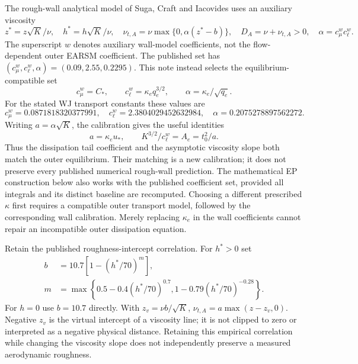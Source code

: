 \documentclass[11pt,a4paper]{article}
\numberwithin{equation}{section}
\begin{document}
The rough-wall analytical model of Suga, Craft and Iacovides \cite{SCI2006} uses an
auxiliary viscosity
\begin{equation}
 z^*=z\sqrt K/\nu,\quad h^*=h\sqrt K/\nu,\quad
 \nu_{t,A}=\nu\max\{0,\alpha(z^*-b)\},\quad
 D_A=\nu+\nu_{t,A}>0,\quad \alpha=c_\mu^wc_\ell^w.
 \label{eq:wj-wall-viscosity}
\end{equation}
The superscript $w$ denotes auxiliary wall-model coefficients, not the
flow-dependent outer EARSM coefficient. The published set has
$(c_\mu^w,c_\ell^w,\alpha)=(0.09,2.55,0.2295)$. This note instead selects
the equilibrium-compatible set
\begin{equation}
 \boxed{c_\mu^w=C_*,\qquad c_\ell^w=\kappa_e q_e^{3/2},\qquad
 \alpha=\kappa_e/\sqrt{q_e}.}
 \label{eq:wj-wall-calibration}
\end{equation}
For the stated WJ transport constants these values are
\begin{equation}
 c_\mu^w=0.0871818320377991,\quad
 c_\ell^w=2.3804029452632984,\quad
 \alpha=0.2075278897562272.
\end{equation}
Writing $a=\alpha\sqrt K$, the calibration gives the useful identities
\begin{equation}
 \boxed{a=\kappa_e u_*,\qquad
 K^{3/2}/c_\ell^w=A_e=t_0^2/a.}
 \label{eq:wj-wall-calibration-identities}
\end{equation}
Thus the dissipation tail coefficient and the asymptotic viscosity slope
both match the outer equilibrium. Their matching is a new calibration;
it does not preserve every published numerical rough-wall prediction.
The mathematical EP construction below also works with the published
coefficient set, provided all integrals and its distinct baseline are
recomputed. Choosing a different prescribed $\kappa$ first requires a
compatible outer transport model, followed by the corresponding wall
calibration. Merely replacing $\kappa_e$ in the wall coefficients cannot
repair an incompatible outer dissipation equation.

Retain the published roughness-intercept correlation. For $h^*>0$ set
\begin{equation}
 \begin{aligned}
 b&=10.7\left[1-(h^*/70)^m\right],\\
 m&=\max\left\{0.5-0.4(h^*/70)^{0.7},
                 1-0.79(h^*/70)^{-0.28}\right\}.
 \end{aligned}
 \label{eq:wj-wall-roughness}
\end{equation}
For $h=0$ use $b=10.7$ directly. With $z_v=\nu b/\sqrt K$,
$\nu_{t,A}=a\max(z-z_v,0)$. Negative $z_v$ is the virtual intercept
of a viscosity line; it is not clipped to zero or interpreted as a
negative physical distance. Retaining this empirical correlation while
changing the viscosity slope does not independently preserve a measured
aerodynamic roughness.
\end{document}

